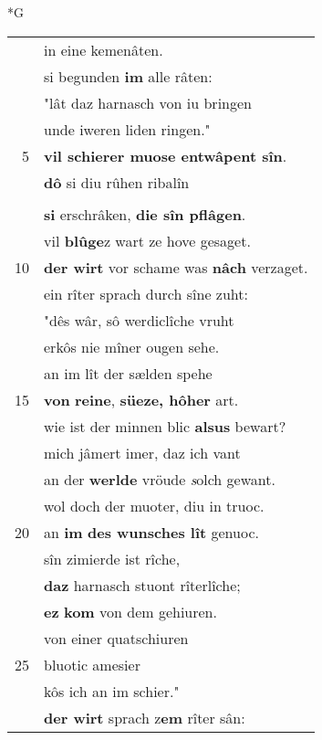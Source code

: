 \documentclass[8pt,a4paper,notitlepage]{article}
\begin{document}
\newpage
\begin{table}[ht]
\begin{minipage}[t]{0.5\linewidth}
\small
\begin{center}*G
\end{center}
\begin{tabular}{rl}
 & in eine kemenâten.\\ 
 & si begunden \textbf{im} alle râten:\\ 
 & "lât daz harnasch von iu bringen\\ 
 & unde iweren liden ringen."\\ 
5 & \textbf{vil schierer muose entwâpent sîn}.\\ 
 & \textbf{dô} si diu rûhen ribalîn\\ 
 & \textbf{\begin{large}U\end{large}nde diu tôren kleit ersâhen},\\ 
 & \textbf{si} erschrâken, \textbf{die sîn pflâgen}.\\ 
 & vil \textbf{blûge}z wart ze hove gesaget.\\ 
10 & \textbf{der wirt} vor schame was \textbf{nâch} verzaget.\\ 
 & ein rîter sprach durch sîne zuht:\\ 
 & "dês wâr, sô werdiclîche vruht\\ 
 & erkôs nie mîner ougen sehe.\\ 
 & an im lît der sælden spehe\\ 
15 & \textbf{von} \textbf{reine}, \textbf{süeze, hôher} art.\\ 
 & wie ist der minnen blic \textbf{alsus} bewart?\\ 
 & mich jâmert imer, daz ich vant\\ 
 & an der \textbf{werlde} vröude \textit{s}olch gewant.\\ 
 & wol doch der muoter, diu in truoc.\\ 
20 & an \textbf{im} \textbf{des wunsches lît} genuoc.\\ 
 & sîn zimierde ist rîche,\\ 
 & \textbf{daz} harnasch stuont rîterlîche;\\ 
 & \textbf{ez} \textbf{kom} von dem gehiuren.\\ 
 & von einer quatschiuren\\ 
25 & bluotic amesier\\ 
 & kôs ich an im schier."\\ 
 & \textbf{der wirt} sprach z\textbf{em} rîter sân:\\ 

\end{tabular}
\end{minipage}
\end{table}
\end{document}
